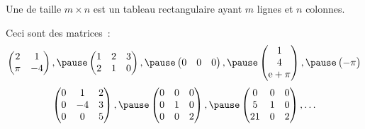 \begin{frame}
  \begin{definition}Une  de taille \(m\times n\) est un tableau rectangulaire\pause{} ayant \(m\) lignes\pause{} et \(n\) colonnes.
  \end{definition}\pause{}
  \begin{example}
    Ceci sont des matrices~:\pause{}
    \begin{equation*}
      \begin{pmatrix}
        2 & 1\\
        \pi & -4
      \end{pmatrix},\pause
      \begin{pmatrix}
        1 & 2 & 3\\
        2 & 1 & 0
      \end{pmatrix},\pause
      \begin{pmatrix}
        0 &0&0
      \end{pmatrix},\pause
      \begin{pmatrix}
        1\\ 4 \\ \textup{e}+\pi
      \end{pmatrix},\pause
      \begin{pmatrix}
        -\pi
      \end{pmatrix}
    \end{equation*}\pause{}
    \begin{equation*}
      \begin{pmatrix}
        0 & 1 & 2\\
        0 & -4 & 3\\
        0 & 0 & 5
      \end{pmatrix},\pause
      \begin{pmatrix}
        0 & 0 & 0\\
        0 & 1 & 0\\
        0 & 0 & 2
      \end{pmatrix},\pause
      \begin{pmatrix}
        0 & 0 & 0\\
        5 & 1 & 0\\
        21 & 0 & 2
      \end{pmatrix},
      \ldots
    \end{equation*}
  \end{example}
\end{frame}
